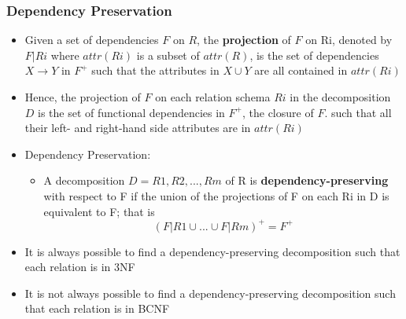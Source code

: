 \subsubsection{Dependency Preservation}
\begin{itemize}
    \item Given a set of dependencies $F$ on $R$, the \textbf{projection} of $F$ on Ri, denoted by $F|Ri$ where $attr(Ri)$ is a subset of $attr(R)$, is the set of dependencies $X\rightarrow Y$ in $F^+$ such that the attributes in $X \cup Y$ are all contained in $attr(Ri)$
    \item Hence, the projection of $F$ on each relation schema $Ri$ in the decomposition $D$ is the set of functional dependencies in $F^+$, the closure of $F$. such that all their left- and right-hand side attributes are in $attr(Ri)$
    \item Dependency Preservation:
    \begin{itemize}
        \item A decomposition $D=R1,R2,...,Rm$ of R is \textbf{dependency-preserving} with respect to F if the union of the projections of F on each Ri in D is equivalent to F; that is \[
        (F|R1 \cup ...\cup F|Rm)^+ = F^+
        \]
    \end{itemize}
    \item It is always possible to find a dependency-preserving decomposition such that each relation is in 3NF
    \item It is not always possible to find a dependency-preserving decomposition such that each relation is in BCNF
\end{itemize}

